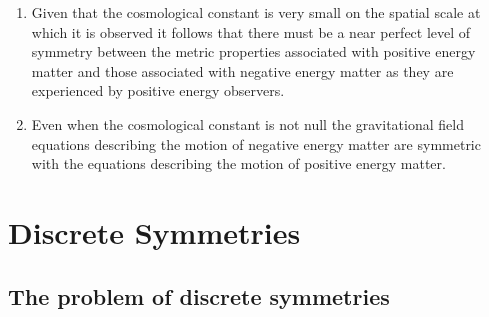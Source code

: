 \documentclass[notitlepage,12pt]{report}
\begin{document}
\begin{enumerate}
\item Given that the cosmological constant is very small on the spatial scale at which it is observed it follows that there must be a near perfect level of symmetry between the metric properties associated with positive energy matter and those associated with negative energy matter as they are experienced by positive energy observers.

\item Even when the cosmological constant is not null the gravitational field equations describing the motion of negative energy matter are symmetric with the equations describing the motion of positive energy matter.

\end{enumerate}


\chapter{Discrete Symmetries\label{chap:03}}

\section{The problem of discrete symmetries}
\end{document}
